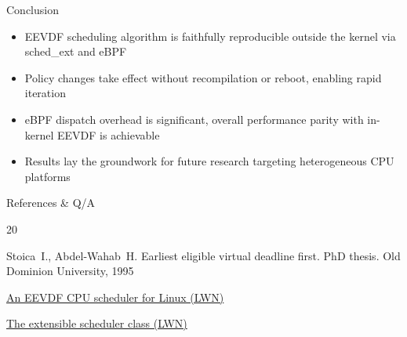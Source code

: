 \documentclass[aspectratio=169]{beamer}
\begin{document}
\begin{frame}{Conclusion}
        \begin{itemize}
                \item EEVDF scheduling algorithm is faithfully reproducible
                        outside the kernel via sched\_ext and eBPF
                        \vspace{0.2cm}
                \item Policy changes take effect without recompilation
                        or reboot, enabling rapid iteration
                        \vspace{0.2cm}
                \item eBPF dispatch overhead is significant,
                        overall performance parity with in-kernel
                        EEVDF is achievable
                        \vspace{0.2cm}
                \item Results lay the groundwork for future research
                        targeting heterogeneous CPU platforms
        \end{itemize}
\end{frame}


\begin{frame}{References \& Q/A}
        \begin{thebibliography}{20}

                Stoica~I., Abdel-Wahab~H.
                Earliest eligible virtual deadline first.
                PhD thesis. Old Dominion University, 1995

                \href{https://lwn.net/Articles/925371}
                {An EEVDF CPU scheduler for Linux (LWN)}

                \href{https://lwn.net/Articles/922405}
                {The extensible scheduler class (LWN)}

        \end{thebibliography}
\end{frame}
\end{document}
